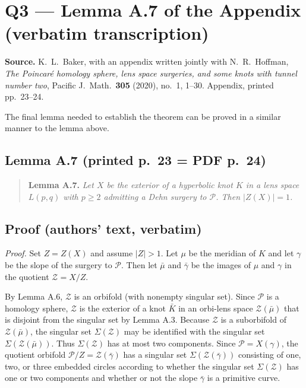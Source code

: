\documentclass[11pt]{article}
\newcommand{\Zs}{\ensuremath{\mathcal{Z}}}   %
\newcommand{\Ps}{\ensuremath{\mathcal{P}}}   %
\begin{document}
\section*{Q3 --- Lemma A.7 of the Appendix (verbatim transcription)}

\noindent\textbf{Source.} K.~L.~Baker, with an appendix written jointly with N.~R.~Hoffman,
\emph{The Poincar\'e homology sphere, lens space surgeries, and some knots with tunnel number two},
Pacific J.\ Math.\ \textbf{305} (2020), no.~1, 1--30. Appendix, printed pp.~23--24.

The final lemma needed to establish the theorem can be proved in a similar
manner to the lemma above.


\subsection*{Lemma A.7 (printed p.~23 = PDF p.~24)}

\begin{quote}
\textbf{Lemma A.7.} \emph{Let $X$ be the exterior of a hyperbolic knot $K$ in a lens space
$L(p,q)$ with $p \ge 2$ admitting a Dehn surgery to $\Ps$. Then $|Z(X)| = 1$.}
\end{quote}

\subsection*{Proof (authors' text, verbatim)}

\textit{Proof.} Set $Z = Z(X)$ and assume $|Z| > 1$. Let $\mu$ be the meridian of $K$ and let
$\gamma$ be the slope of the surgery to $\Ps$. Then let $\bar\mu$ and $\bar\gamma$ be the images
of $\mu$ and $\gamma$ in the quotient $\Zs = X/Z$.

By Lemma A.6, $\Zs$ is an orbifold (with nonempty singular set). Since $\Ps$ is a homology
sphere, $\Zs$ is the exterior of a knot $\bar K$ in an orbi-lens space $\Zs(\bar\mu)$ that is
disjoint from the singular set by Lemma A.3. Because $\Zs$ is a suborbifold of $\Zs(\bar\mu)$,
the singular set $\Sigma(\Zs)$ may be identified with the singular set $\Sigma(\Zs(\bar\mu))$.
Thus $\Sigma(\Zs)$ has at most two components. Since $\Ps = X(\gamma)$, the quotient orbifold
$\Ps/Z = \Zs(\bar\gamma)$ has a singular set $\Sigma(\Zs(\bar\gamma))$ consisting of one, two, or
three embedded circles according to whether the singular set $\Sigma(\Zs)$ has one or two
components and whether or not the slope $\bar\gamma$ is a primitive curve.
\end{document}
